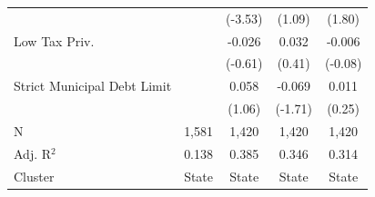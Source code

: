 \begin{tabular*}{\textwidth}{@{\extracolsep{\fill}}lcccc}
                               &               & (-3.53)       & (1.09)       & (1.80)\\   
   Low Tax Priv.               &               & -0.026         & 0.032         & -0.006\\   
                               &               & (-0.61)       & (0.41)       & (-0.08)\\   
   Strict Municipal Debt Limit &               & 0.058          & -0.069        & 0.011\\   
                               &               & (1.06)        & (-1.71)      & (0.25)\\   
   \hline
   N                & 1,581         & 1,420          & 1,420         & 1,420\\  
   Adj. R$^2$              & 0.138         & 0.385          & 0.346         & 0.314\\  
   Cluster              & State & State & State & State\\  
   \bottomrule
\end{tabular*}
\par\endgroup
